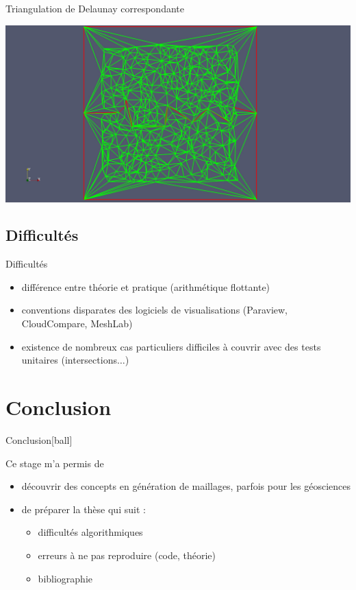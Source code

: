 \documentclass[aspectratio=169, 12pt, a4paper, hyperref={pdfauthor={Alexandre MARIN}, pdfkeywords={IFPEN, Delaunay, Voronoi, mesh generation}, colorlinks=true, linkcolor=purple, urlcolor=blue, citecolor=magenta}]{beamer}
\begin{document}
\begin{Energie}{\normalsize Triangulation de Delaunay correspondante}
\begin{center}\vspace{-1cm}
\includegraphics[scale=0.18, viewport=480 0 1630 1300, clip]{interfaceInSquare.jpg}
\end{center}
\end{Energie}

\subsection{Difficultés}

\begin{Energie}{Difficultés}
\begin{itemize}
\item différence entre théorie et pratique (arithmétique flottante)
\item conventions disparates des logiciels de visualisations (Paraview, CloudCompare, MeshLab)
\item existence de nombreux cas particuliers difficiles à couvrir avec des tests unitaires (intersections$\dots$)
\end{itemize}
\end{Energie}

\section{Conclusion}
\begin{Energie}{Conclusion}[ball]

Ce stage m'a permis de

\begin{itemize}
\item<1-> découvrir des concepts en génération de maillages, parfois pour les géosciences
\item<2-> de préparer la thèse qui suit : 
\begin{itemize}
\item<3-> difficultés algorithmiques
\item<4-> erreurs à ne pas reproduire (code, théorie)
\item<5-> bibliographie
\end{itemize}
\end{itemize}
\end{Energie}
\end{document}
